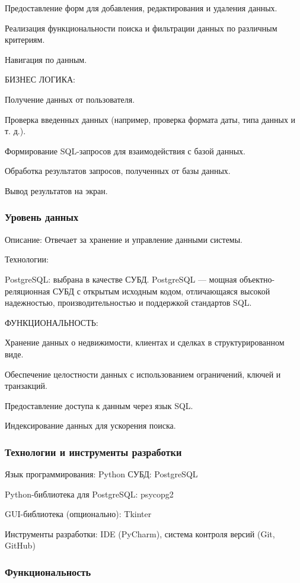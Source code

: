 Предоставление форм для добавления, редактирования и удаления данных.

Реализация функциональности поиска и фильтрации данных по различным критериям.

Навигация по данным.

БИЗНЕС ЛОГИКА:

Получение данных от пользователя.

Проверка введенных данных (например, проверка формата даты, типа данных и т. д.).

Формирование SQL-запросов для взаимодействия с базой данных.

Обработка результатов запросов, полученных от базы данных.

Вывод результатов на экран.

\subsubsection{Уровень данных}

Описание: Отвечает за хранение и управление данными системы.

Технологии:

PostgreSQL: выбрана в качестве СУБД. PostgreSQL — мощная объектно-реляционная СУБД с открытым исходным кодом, отличающаяся высокой надежностью, производительностью и поддержкой стандартов SQL.

ФУНКЦИОНАЛЬНОСТЬ:

Хранение данных о недвижимости, клиентах и сделках в структурированном виде.

Обеспечение целостности данных с использованием ограничений, ключей и транзакций.

Предоставление доступа к данным через язык SQL.

Индексирование данных для ускорения поиска.

\subsubsection{Технологии и инструменты разработки}

Язык программирования: Python
СУБД: PostgreSQL

Python-библиотека для PostgreSQL: psycopg2

GUI-библиотека (опционально): Tkinter

Инструменты разработки: IDE (PyCharm), система контроля версий (Git, GitHub)

\subsubsection{Функциональность}

